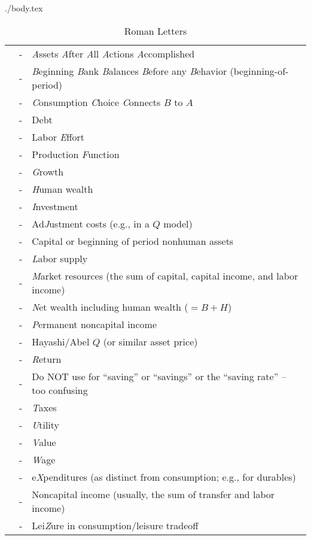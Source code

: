 \documentclass{econtex}
\begin{document}
\begin{verbatimwrite}{./body.tex}
\begin{table}[h]
\begin{center}
\begin{tabular}{lcl} \\
    \ALev & - & {\it A}ssets {\it A}fter {\it A}ll {\it A}ctions {\it A}ccomplished%
\\  \BLev & - & {\it B}eginning {\it B}ank {\it B}alances {\it B}efore any {\it B}ehavior (beginning-of-period)
\\  \CLev & - & {\it C}onsumption {\it C}hoice {\it C}onnects $B$ to $A$
\\  \DLev & - & Debt
\\  \ELev & - & Labor {\it E}ffort
\\  \FLev & - & Production {\it F}unction
\\  \GLev & - & {\it G}rowth 
\\  \HLev & - & {\it H}uman wealth
\\  \ILev & - & {\it I}nvestment
\\  \JLev & - & Ad{\it J}ustment costs (e.g., in a $Q$ model)
\\  \KLev & - & Capital or beginning of period nonhuman assets
\\  \LLev & - & {\it L}abor supply
\\  \MLev & - & {\it M}arket resources (the sum of capital, capital income, and labor income)
\\  \NLev & - & {\it N}et wealth including human wealth ($=B + H$)
\\  \PLev & - & {\it P}ermanent noncapital income
\\  \QLev & - & Hayashi/Abel $Q$ (or similar asset price)
\\  \RLev & - & {\it R}eturn
\\  \SLev & - & Do NOT use for ``saving'' or ``savings'' or the ``saving rate'' -- too confusing
\\  \TLev & - & {\it T}axes
\\  \ULev & - & {\it U}tility
\\  \VLev & - & {\it V}alue
\\  \WLev & - & {\it W}age
\\  \XLev & - & e{\it X}penditures (as distinct from consumption; e.g., for durables)
\\  \YLev & - & Noncapital income (usually, the sum of transfer and labor income)
\\  \ZLev & - & Lei{\it Z}ure in consumption/leisure tradeoff
\end{tabular}
\end{center}
\caption{Roman Letters}
\label{table:RomanLetters}
\end{table}

\end{verbatimwrite}

\end{document}
